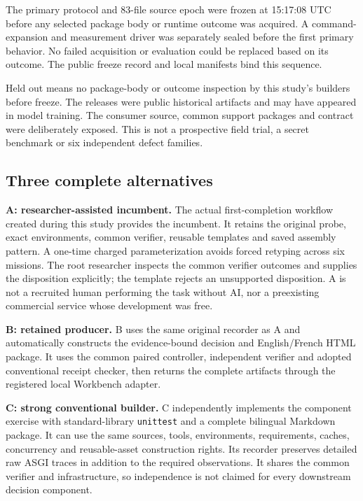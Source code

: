 \documentclass[11pt,a4paper]{article}
\begin{document}
The primary protocol and 83-file source epoch were frozen at 15:17:08 UTC before any selected package body or runtime outcome was acquired. A command-expansion and measurement driver was separately sealed before the first primary behavior. No failed acquisition or evaluation could be replaced based on its outcome. The public freeze record and local manifests bind this sequence.\cite{freeze,protocol}

Held out means no package-body or outcome inspection by this study's builders before freeze. The releases were public historical artifacts and may have appeared in model training. The consumer source, common support packages and contract were deliberately exposed. This is not a prospective field trial, a secret benchmark or six independent defect families.

\subsection{Three complete alternatives}

\textbf{A: researcher-assisted incumbent.} The actual first-completion workflow created during this study provides the incumbent. It retains the original probe, exact environments, common verifier, reusable templates and saved assembly pattern. A one-time charged parameterization avoids forced retyping across six missions. The root researcher inspects the common verifier outcomes and supplies the disposition explicitly; the template rejects an unsupported disposition. A is not a recruited human performing the task without AI, nor a preexisting commercial service whose development was free.\cite{incumbent}

\textbf{B: retained producer.} B uses the same original recorder as A and automatically constructs the evidence-bound decision and English/French HTML package. It uses the common paired controller, independent verifier and adopted conventional receipt checker, then returns the complete artifacts through the registered local Workbench adapter.\cite{companion}

\textbf{C: strong conventional builder.} C independently implements the component exercise with standard-library \texttt{unittest} and a complete bilingual Markdown package. It can use the same sources, tools, environments, requirements, caches, concurrency and reusable-asset construction rights. Its recorder preserves detailed raw ASGI traces in addition to the required observations. It shares the common verifier and infrastructure, so independence is not claimed for every downstream decision component.\cite{conventional}
\end{document}

